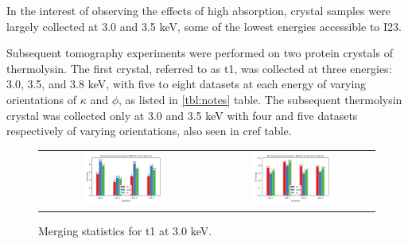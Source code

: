 In the interest of observing the effects of high absorption, crystal samples were largely collected at 3.0 and 3.5 keV, some of the lowest energies accessible to I23.

Subsequent tomography experiments were performed on two protein crystals of thermolysin. The first crystal, referred to as \ac{t1}, was collected at three energies: 3.0, 3.5, and 3.8 keV, with five to eight datasets at each energy of varying orientations of $\kappa$ and $\phi$, as listed in \cref{tbl:notes} table. The subsequent thermolysin crystal was collected only at 3.0 and 3.5 keV with four and five datasets respectively of varying orientations, also seen in cref table.

\begin{figure}[h]
    \centering
    \begin{tabular}{cc}
    \includegraphics[width = 0.5\textwidth]{plots/exp1/tlys_9_P6122/3p0_I_over_sigma.png} & \includegraphics[width = 0.5\textwidth]{plots/exp1/tlys_9_P6122/3p0_rmerges.png}
    \end{tabular}
    \caption{Merging statistics for \ac{t1} at 3.0 keV.}
    \label{fig:tlys_2_p6}
\end{figure}

